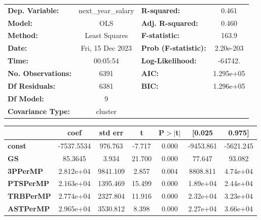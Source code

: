 \begin{center}
\begin{tabular}{lclc}
\toprule
\textbf{Dep. Variable:}    & next\_year\_salary & \textbf{  R-squared:         } &     0.461   \\
\textbf{Model:}            &        OLS         & \textbf{  Adj. R-squared:    } &     0.460   \\
\textbf{Method:}           &   Least Squares    & \textbf{  F-statistic:       } &     163.9   \\
\textbf{Date:}             &  Fri, 15 Dec 2023  & \textbf{  Prob (F-statistic):} & 2.20e-203   \\
\textbf{Time:}             &      00:05:54      & \textbf{  Log-Likelihood:    } &   -64742.   \\
\textbf{No. Observations:} &         6391       & \textbf{  AIC:               } & 1.295e+05   \\
\textbf{Df Residuals:}     &         6381       & \textbf{  BIC:               } & 1.296e+05   \\
\textbf{Df Model:}         &            9       & \textbf{                     } &             \\
\textbf{Covariance Type:}  &      cluster       & \textbf{                     } &             \\
\bottomrule
\end{tabular}
\begin{tabular}{lcccccc}
                       & \textbf{coef} & \textbf{std err} & \textbf{t} & \textbf{P$> |$t$|$} & \textbf{[0.025} & \textbf{0.975]}  \\
\midrule
\textbf{const}         &   -7537.5534  &      976.763     &    -7.717  &         0.000        &    -9453.861    &    -5621.245     \\
\textbf{GS}            &      85.3645  &        3.934     &    21.700  &         0.000        &       77.647    &       93.082     \\
\textbf{3PPerMP}       &    2.812e+04  &     9841.109     &     2.857  &         0.004        &     8808.811    &     4.74e+04     \\
\textbf{PTSPerMP}      &    2.163e+04  &     1395.469     &    15.499  &         0.000        &     1.89e+04    &     2.44e+04     \\
\textbf{TRBPerMP}      &    2.774e+04  &     2327.804     &    11.916  &         0.000        &     2.32e+04    &     3.23e+04     \\
\textbf{ASTPerMP}      &    2.965e+04  &     3530.812     &     8.398  &         0.000        &     2.27e+04    &     3.66e+04     \\

\end{tabular}
\end{center}
